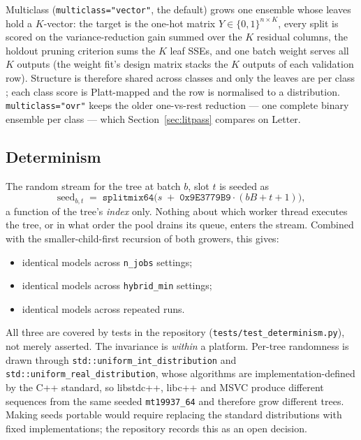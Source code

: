 \documentclass[11pt,a4paper]{article}
\newcommand{\code}[1]{\texttt{\small #1}}
\theoremstyle{definition}
\begin{document}
Multiclass (\code{multiclass="vector"}, the default) grows one ensemble whose
leaves hold a $K$-vector: the target is the one-hot matrix $Y \in
\{0,1\}^{n \times K}$, every split is scored on the variance-reduction gain
summed over the $K$ residual columns, the holdout pruning criterion sums the
$K$ leaf SSEs, and one batch weight serves all $K$ outputs (the weight fit's
design matrix stacks the $K$ outputs of each validation row). Structure is
therefore shared across classes and only the leaves are per class
\cite{ponomareva2017compact}; each class score is Platt-mapped and the row is
normalised to a distribution. \code{multiclass="ovr"} keeps the older
one-vs-rest reduction --- one complete binary ensemble per class --- which
Section~\ref{sec:litpass} compares on Letter.

\subsection{Determinism}\label{sec:determinism}

The random stream for the tree at batch $b$, slot $t$ is seeded as
\begin{equation}
\text{seed}_{b,t} \;=\; \texttt{splitmix64}\big(s \;+\; \texttt{0x9E3779B9} \cdot (bB + t + 1)\big),
\end{equation}
a function of the tree's \emph{index} only. Nothing about which worker thread
executes the tree, or in what order the pool drains its queue, enters the
stream. Combined with the smaller-child-first recursion of both growers, this
gives:

\begin{itemize}[leftmargin=1.5em,itemsep=1pt]
\item identical models across \code{n\_jobs} settings;
\item identical models across \code{hybrid\_min} settings;
\item identical models across repeated runs.
\end{itemize}

All three are covered by tests in the repository (\code{tests/test\_determinism.py}),
not merely asserted. The invariance is \emph{within} a platform. Per-tree
randomness is drawn through \code{std::uniform\_int\_distribution} and
\code{std::uniform\_real\_distribution}, whose algorithms are
implementation-defined by the C++ standard, so libstdc++, libc++ and MSVC
produce different sequences from the same seeded \code{mt19937\_64} and
therefore grow different trees. Making seeds portable would require replacing
the standard distributions with fixed implementations; the repository records
this as an open decision.
\end{document}
